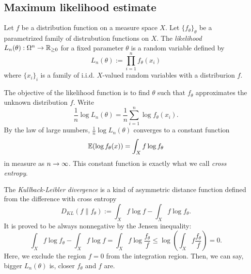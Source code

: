 \documentclass{../exp}
\begin{document}
\subsection{Maximum likelihood estimate}
\begin{defn}
Let $f$ be a distribution function on a measure space $X$.
Let $\{f_\theta\}_\theta$ be a parametrized family of distrubution functions on $X$.
The \emph{likelihood} $L_n(\theta):\Omega^n\to\R_{\ge0}$ for a fixed parameter $\theta$ is a random variable defined by
\[L_n(\theta):=\prod_{i=1}^nf_\theta(x_i)\]
where $\{x_i\}_i$ is a family of i.i.d. $X$-valued random variables with a distriburion $f$.
\end{defn}
The objective of the likelihood function is to find $\theta$ such that $f_\theta$ approximates the unknown distribution $f$.
Write
\[\frac1n\log L_n(\theta)=\frac1n\sum_{i=1}^n\log f_\theta(x_i).\]
By the law of large numbers, $\frac1n\log L_n(\theta)$ converges to a constant function
\[\mathbb{E}(\log f_\theta(x))=\int_Xf\log f_\theta\]
in measure as $n\to\oo$.
This constant function is exactly what we call \emph{cross entropy}.

The \emph{Kullback-Leibler divergence} is a kind of asymmetric distance function defined from the difference with cross entropy
\[D_{KL}(f\|f_\theta):=\int_Xf\log f-\int_Xf\log f_\theta.\]
It is proved to be always nonnegative by the Jensen inequality: 
\[\int_Xf\log f_\theta-\int_Xf\log f=\int_Xf\log\frac{f_\theta}f\le\log\left(\int_Xf\frac{f_\theta}f\right)=0.\]
Here, we exclude the region $f=0$ from the integration region.
Then, we can say, bigger $L_n(\theta)$ is, closer $f_\theta$ and $f$ are.
\end{document}
